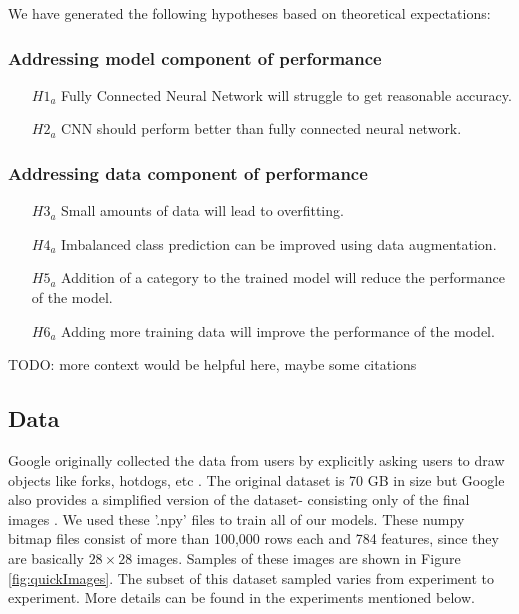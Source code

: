 \documentclass[12pt]{article}
\begin{document}
We have generated the following hypotheses based on theoretical
expectations:

\subsubsection{Addressing model component of performance}

\begin{itemize}
  \item[$H1_a$] Fully Connected Neural Network will struggle to get reasonable
    accuracy.
  \item[$H2_a$] CNN should perform better than fully connected neural network.
  \end{itemize}

\subsubsection{Addressing data component of performance}

\begin{itemize}
\item[$H3_a$] Small amounts of data will lead to overfitting.
\item[$H4_a$] Imbalanced class prediction can be improved using data
  augmentation.
\item[$H5_a$] Addition of a category to the trained model will reduce the
  performance of the model.
\item[$H6_a$] Adding more training data will improve the performance of the
  model.
\end{itemize}

TODO: more context would be helpful here, maybe some citations

\subsection{Data}

Google originally collected the data from users by explicitly asking users to
draw objects like forks, hotdogs, etc \cite{QuickDra91:online}. The original
dataset is 70 GB in size but Google also provides a simplified version of the
dataset- consisting only of the final images \cite{googlecr61:online}. We
used these '.npy' files to train all of our models. These numpy bitmap files
consist of more than 100,000 rows each and 784
features, since they are basically $28 \times 28$ images. Samples of these
images are shown in Figure \ref{fig:quickImages}. The subset of this
dataset sampled varies from experiment to experiment. More details can be
found in the experiments mentioned below.
\end{document}
